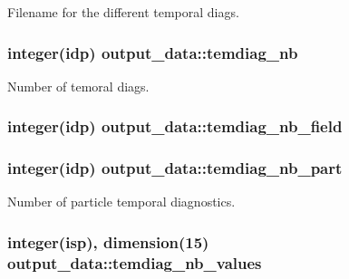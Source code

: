 Filename for the different temporal diags. 

\subsubsection[{\texorpdfstring{temdiag\+\_\+nb}{temdiag_nb}}]{\setlength{\rightskip}{0pt plus 5cm}integer(idp) output\+\_\+data\+::temdiag\+\_\+nb}\hypertarget{namespaceoutput__data_a996655a7d030216dcce6367a59b22ae8}{}\label{namespaceoutput__data_a996655a7d030216dcce6367a59b22ae8}


Number of temoral diags. 

\subsubsection[{\texorpdfstring{temdiag\+\_\+nb\+\_\+field}{temdiag_nb_field}}]{\setlength{\rightskip}{0pt plus 5cm}integer(idp) output\+\_\+data\+::temdiag\+\_\+nb\+\_\+field}\hypertarget{namespaceoutput__data_a6e3150da1e4314b418b4f40c56737551}{}\label{namespaceoutput__data_a6e3150da1e4314b418b4f40c56737551}
\subsubsection[{\texorpdfstring{temdiag\+\_\+nb\+\_\+part}{temdiag_nb_part}}]{\setlength{\rightskip}{0pt plus 5cm}integer(idp) output\+\_\+data\+::temdiag\+\_\+nb\+\_\+part}\hypertarget{namespaceoutput__data_a950d70a052698f77988f39da1fddf632}{}\label{namespaceoutput__data_a950d70a052698f77988f39da1fddf632}


Number of particle temporal diagnostics. 

\subsubsection[{\texorpdfstring{temdiag\+\_\+nb\+\_\+values}{temdiag_nb_values}}]{\setlength{\rightskip}{0pt plus 5cm}integer(isp), dimension(15) output\+\_\+data\+::temdiag\+\_\+nb\+\_\+values}\hypertarget{namespaceoutput__data_aa73fc47cc7d7d0cee7422d6fee957c48}{}\label{namespaceoutput__data_aa73fc47cc7d7d0cee7422d6fee957c48}


